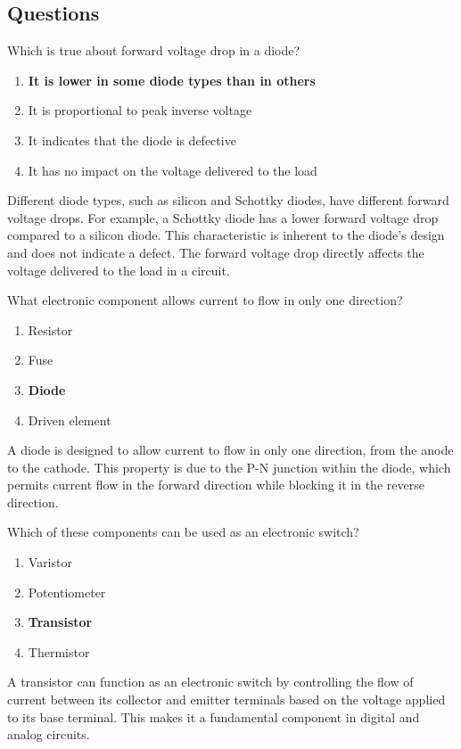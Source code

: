 \subsection*{Questions}
\begin{tcolorbox}[colback=gray!10!white,colframe=black!75!black,title={T6B01}]
    Which is true about forward voltage drop in a diode?
    \begin{enumerate}[label=\Alph*,noitemsep]
        \item \textbf{It is lower in some diode types than in others}
        \item It is proportional to peak inverse voltage
        \item It indicates that the diode is defective
        \item It has no impact on the voltage delivered to the load
    \end{enumerate}
\end{tcolorbox}
Different diode types, such as silicon and Schottky diodes, have different forward voltage drops. For example, a Schottky diode has a lower forward voltage drop compared to a silicon diode. This characteristic is inherent to the diode's design and does not indicate a defect. The forward voltage drop directly affects the voltage delivered to the load in a circuit. %

\begin{tcolorbox}[colback=gray!10!white,colframe=black!75!black,title={T6B02}]
    What electronic component allows current to flow in only one direction?
    \begin{enumerate}[label=\Alph*,noitemsep]
        \item Resistor
        \item Fuse
        \item \textbf{Diode}
        \item Driven element
    \end{enumerate}
\end{tcolorbox}
A diode is designed to allow current to flow in only one direction, from the anode to the cathode. This property is due to the P-N junction within the diode, which permits current flow in the forward direction while blocking it in the reverse direction. %

\begin{tcolorbox}[colback=gray!10!white,colframe=black!75!black,title={T6B03}]
    Which of these components can be used as an electronic switch?
    \begin{enumerate}[label=\Alph*,noitemsep]
        \item Varistor
        \item Potentiometer
        \item \textbf{Transistor}
        \item Thermistor
    \end{enumerate}
\end{tcolorbox}
A transistor can function as an electronic switch by controlling the flow of current between its collector and emitter terminals based on the voltage applied to its base terminal. This makes it a fundamental component in digital and analog circuits. %

